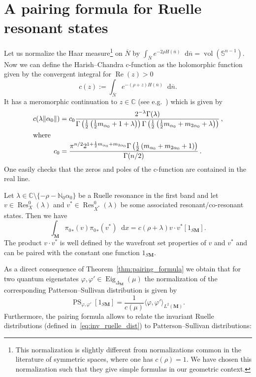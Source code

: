 \documentclass[AHL, Unicode, longabstracts, published]{cedram}
\DeclareMathOperator{\Res}{Res}
\DeclareMathOperator{\Eig}{Eig}
\DeclareMathOperator{\Real}{Re}
\DeclareMathOperator{\vol}{vol}
\newcommand{\cc}{\mathbb{C}}
\newcommand{\N}{\mathbb{N}}
\newcommand{\intd}{\mathop{}\!\mathrm{d}}
\newcommand{\bn}{{\overline{n}}}
\newcommand{\bN}{{\overline{N}}}
\begin{document}
\section{A pairing formula for Ruelle resonant states}

Let us normalize the Haar measure\footnote{This normalization is slightly different from normalizations common in the literature of symmetric spaces, where one has $c(\rho)=1$. We have chosen this normalization such that they give simple formulas in our geometric context.} on $\bN$ by $\int_\bN e^{-2\rho H(\bn)} \intd \bn =\vol(\mathbb S^{n-1})$. Now we can define the Harish--Chandra c-function as the holomorphic function given by the convergent integral for $\Real(z)>0$
\begin{equation}\label{HCc}
c(z):=\int_\bN e^{-(\rho+z)H(\bn)} \intd \bn.
\end{equation}
It has a meromorphic continuation to $z\in\cc$ (see e.g.~\cite[IV.6]{Hel84}) which is given by
\begin{align*}
c(\lambda\|\alpha_0\|) &= c_0\frac{2^{-\lambda}\Gamma(\lambda)}{\Gamma\left(\frac{1}{2}\left(\frac{1}{2}m_{\alpha_0} + 1 +\lambda\right)\right)\Gamma\left(\frac{1}{2}\left(\frac{1}{2}m_{\alpha_0} + m_{2\alpha_0} + \lambda\right)\right)}\,,
\\
\intertext{where}
c_0 &= \frac{\pi^{n/2}2^{1+\frac{1}{2}m_{\alpha_0} + m_{2\alpha_0}}\Gamma\left(\frac{1}{2}\left(m_{\alpha_0} + m_{2\alpha_0}+1\right)\right)}{\Gamma(n/2)}\,.
\end{align*}
One easily checks that the zeros and poles of the c-function are contained in the real line.

\begin{theo}\label{thm:pairing_formula}
Let $\lambda\in\cc\setminus\{-\rho - \N_0\alpha_0\}$ be a Ruelle resonance in the first band and let $v\in \Res^0_X(\lambda)$ and $v^ *\in
\Res^0_{X^*}(\lambda)$ be some associated resonant/co-resonant states. Then we have
\[
\int_{\mathbf M} {\pi_0}_*(v) {\pi_0}_*(v^*) \intd x = c(\rho+\lambda) v\cdot v^* [1_{S\mathbf M}].
\]
The product $v\cdot v^*$ is well defined by the wavefront set properties of $v$ and $v^*$ and can be paired with the constant one function $1_{S\mathbf M}$.
\end{theo}


As a direct consequence of Theorem~\ref{thm:pairing_formula} we obtain that for two quantum eigenstates $\varphi,\varphi'\in \Eig_{\Delta_{\mathbf M}}(\mu)$ the normalization of the corresponding Patterson--Sullivan distribution is given by
\[
\operatorname{PS}_{\varphi,\varphi'}[1_{S\mathbf M}] = \frac{1}{c(\mu)} \langle\varphi,\varphi'\rangle_{L^2(\mathbf M)}.
\]
Furthermore, the pairing formula allows to relate the invariant Ruelle distributions (defined in~\eqref{eq:inv_ruelle_dist}) to Patterson--Sullivan distributions:
\end{document}

